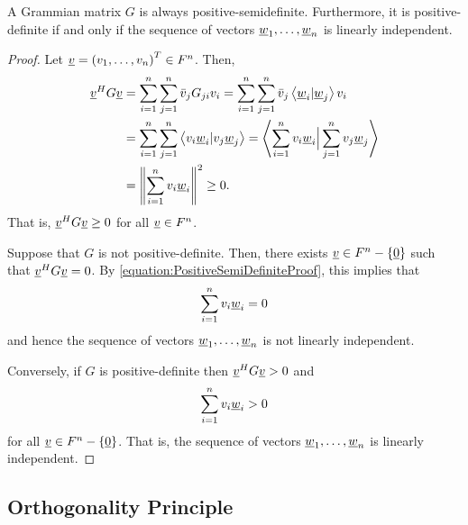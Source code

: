 \begin{theorem}
A Grammian matrix $G$ is always positive-semidefinite.
Furthermore, it is positive-definite if and only if the sequence of vectors $\underline{w}_1, \ldots, \underline{w}_n$ is linearly independent.
\end{theorem}
\begin{proof}
Let $\underline{v} = \left( v_1, \ldots, v_n \right)^T \in F^n$.
Then,
\begin{equation} \label{equation:PositiveSemiDefiniteProof}
\begin{split}
\underline{v}^H G \underline{v} &=
\sum_{i=1}^n \sum_{j=1}^n \bar{v}_j G_{ji} v_i
= \sum_{i=1}^n \sum_{j=1}^n \bar{v}_j \left\langle \underline{w}_i | \underline{w}_j \right\rangle v_i \\
&= \sum_{i=1}^n \sum_{j=1}^n \left\langle v_i \underline{w}_i | v_j \underline{w}_j \right\rangle
= \left\langle \sum_{i=1}^n v_i \underline{w}_i \Big| \sum_{j=1}^n v_j \underline{w}_j \right\rangle \\
&= \left\| \sum_{i=1}^n v_i \underline{w}_i \right\|^2
\geq 0.
\end{split}
\end{equation}
That is, $\underline{v}^H G \underline{v} \geq 0$ for all $\underline{v} \in F^n$.

Suppose that $G$ is not positive-definite.
Then, there exists $\underline{v} \in F^n - \left\{ \underline{0} \right\}$ such that $\underline{v}^H G \underline{v} = 0$.
By \eqref{equation:PositiveSemiDefiniteProof}, this implies that
\begin{equation*}
\sum_{i=1}^n v_i \underline{w}_i = 0
\end{equation*}
and hence the sequence of vectors $\underline{w}_1, \ldots, \underline{w}_n$ is not linearly independent.

Conversely, if $G$ is positive-definite then $\underline{v}^H G \underline{v} > 0$ and
\begin{equation*}
\sum_{i=1}^n v_i \underline{w}_i > 0
\end{equation*}
for all $\underline{v} \in F^n - \left\{ \underline{0} \right\}$.
That is, the sequence of vectors $\underline{w}_1, \ldots, \underline{w}_n$ is linearly independent.
\end{proof}


\subsection{Orthogonality Principle}

